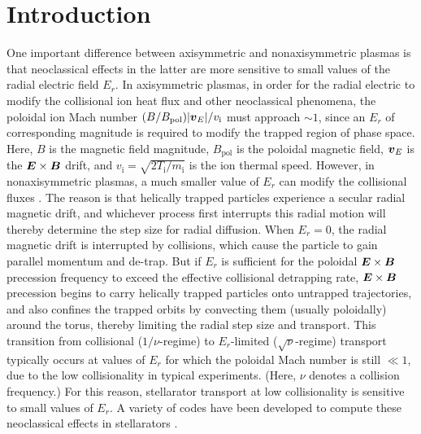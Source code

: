 \documentclass[12pt]{revtex4}
\newcommand{\vect}[1]{\mbox{\boldmath $#1$}}
\newcommand{\vi}{v_{\mathrm{i}}}
\newcommand{\mi}{m_{\mathrm{i}}}
\newcommand{\Ti}{T_{\mathrm{i}}}
\newcommand{\Bpol}{B_{\mathrm{pol}}}
\begin{document}
\pacs{}%

\maketitle %


\section{Introduction}

One important difference between axisymmetric and nonaxisymmetric plasmas is
that neoclassical effects in the latter are more sensitive to small values of the radial
electric field $E_r$. In axisymmetric plasmas, in order for the radial electric to modify the collisional ion heat flux
and other neoclassical phenomena,
the poloidal ion Mach number $(B / \Bpol) |\vect{v}_E|/\vi$ must approach $\sim 1$,
since an $E_r$ of corresponding magnitude is required to modify the trapped region of phase space\cite{GrishaNeo}.
Here, $B$ is the magnetic field magnitude, $\Bpol$ is the poloidal magnetic field,
$\vect{v}_E$ is the $\vect{E}\times\vect{B}$ drift, and $\vi=\sqrt{2 \Ti / \mi}$ is the ion thermal speed.
However, in nonaxisymmetric plasmas, 
a much smaller value of $E_r$ can modify the collisional fluxes \cite{Galeev, HoKulsrud, BeidlerBigBenchmarking}.
The reason is that helically trapped particles experience a secular radial magnetic drift, and
whichever process first interrupts this radial motion will thereby determine the step size for radial diffusion.
When $E_r=0$, the radial magnetic drift is interrupted by collisions, which cause
the particle to gain parallel momentum and de-trap.
But if $E_r$ is sufficient for the poloidal $\vect{E}\times\vect{B}$
precession frequency to exceed the effective collisional detrapping rate, $\vect{E}\times\vect{B}$ precession
begins to carry helically trapped particles onto untrapped trajectories, 
and also confines the trapped orbits by convecting them (usually poloidally) around the torus,
thereby limiting the radial step size and transport.
This transition from collisional ($1/\nu$-regime) to $E_r$-limited ($\sqrt{\nu}$-regime) transport
typically occurs at values of $E_r$ for which the poloidal Mach number is still $\ll 1$, due to the low collisionality
in typical experiments. (Here, $\nu$ denotes a collision frequency.)
For this reason, stellarator transport at low collisionality is sensitive to small values of $E_r$.
A variety of codes have been developed to compute 
these neoclassical effects in stellarators \cite{DKES1, DKES2, GSRAKE, Tribaldos2001, PENTA, Kernbichler1, FORTEC_PFR, FORTEC_CPC, JOSE}.
\end{document}
